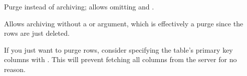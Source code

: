\documentclass[letterpaper,10pt,english]{sphinxmanual}
\begin{document}

\begin{fulllineitems}
\label{\detokenize{mariadb-archiver:cmdoption-mariadb-archiver-purge}}
\sphinxAtStartPar
Purge instead of archiving; allows omitting {\hyperref[\detokenize{mariadb-archiver:cmdoption-mariadb-archiver-file}]{}} and {\hyperref[\detokenize{mariadb-archiver:cmdoption-mariadb-archiver-dest}]{}}.

\sphinxAtStartPar
Allows archiving without a {\hyperref[\detokenize{mariadb-archiver:cmdoption-mariadb-archiver-file}]{}} or {\hyperref[\detokenize{mariadb-archiver:cmdoption-mariadb-archiver-dest}]{}} argument, which is
effectively a purge since the rows are just deleted.

\sphinxAtStartPar
If you just want to purge rows, consider specifying the table’s primary key
columns with {\hyperref[\detokenize{mariadb-archiver:cmdoption-mariadb-archiver-primary-key-only}]{}}.  This will prevent fetching all columns
from the server for no reason.

\end{fulllineitems}

\end{document}

